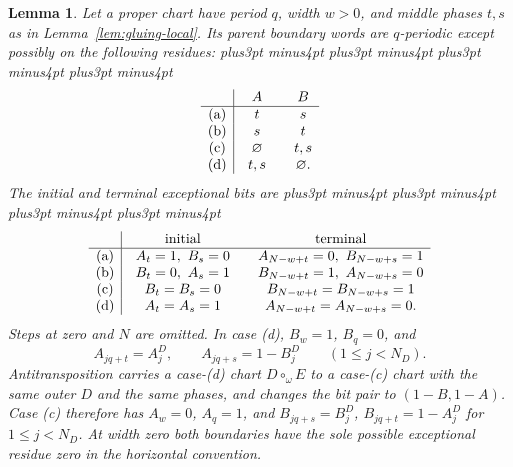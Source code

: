 \documentclass[11pt,a4paper]{amsart}
\numberwithin{equation}{section}
\theoremstyle{plain}
\newtheorem{lemma}[theorem]{Lemma}
\theoremstyle{definition}
\begin{document}
\begin{lemma}\label{lem:gluing-coding}
Let a proper chart have period \(q\), width \(w>0\), and middle phases \(t,s\) as in Lemma~\ref{lem:gluing-local}.  Its parent boundary words are \(q\)-periodic except possibly on the following residues:
{\abovedisplayskip=14pt plus3pt minus4pt \belowdisplayskip=14pt plus3pt minus4pt
 \abovedisplayshortskip=14pt plus3pt minus4pt \belowdisplayshortskip=14pt plus3pt minus4pt
\begin{equation}\label{eq:gluing-holes}
 \begin{array}{c|@{\quad}c@{\qquad}c}
 &A&B\\ \hline
 \mathrm{(a)}&t&s\\
 \mathrm{(b)}&s&t\\
 \mathrm{(c)}&\varnothing&t,s\\
 \mathrm{(d)}&t,s&\varnothing.
 \end{array}
\end{equation}}
The initial and terminal exceptional bits are
{\abovedisplayskip=14pt plus3pt minus4pt \belowdisplayskip=14pt plus3pt minus4pt
 \abovedisplayshortskip=14pt plus3pt minus4pt \belowdisplayshortskip=14pt plus3pt minus4pt
\begin{equation}\label{eq:gluing-caps}
 \begin{array}{c|@{\quad}c@{\qquad}c}
 &\text{initial}&\text{terminal}\\ \hline
 \mathrm{(a)}&A_t=1,\ B_s=0&A_{N-w+t}=0,\ B_{N-w+s}=1\\
 \mathrm{(b)}&B_t=0,\ A_s=1&B_{N-w+t}=1,\ A_{N-w+s}=0\\
 \mathrm{(c)}&B_t=B_s=0&B_{N-w+t}=B_{N-w+s}=1\\
 \mathrm{(d)}&A_t=A_s=1&A_{N-w+t}=A_{N-w+s}=0.
 \end{array}
\end{equation}}
Steps at zero and \(N\) are omitted.  In case (d), \(B_w=1\), \(B_q=0\), and
\begin{equation}\label{eq:gluing-interface}
 A_{jq+t}=A^D_j,\qquad A_{jq+s}=1-B^D_j\qquad(1\le j<N_D).
\end{equation}
Antitransposition carries a case-(d) chart \(D\circ_\omega E\) to a case-(c) chart with the same outer \(D\) and the same phases, and changes the bit pair to \((1-B,1-A)\).  Case (c) therefore has \(A_w=0\), \(A_q=1\), and \(B_{jq+s}=B^D_j\), \(B_{jq+t}=1-A^D_j\) for \(1\le j<N_D\).  At width zero both boundaries have the sole possible exceptional residue zero in the horizontal convention.
\end{lemma}
\end{document}

